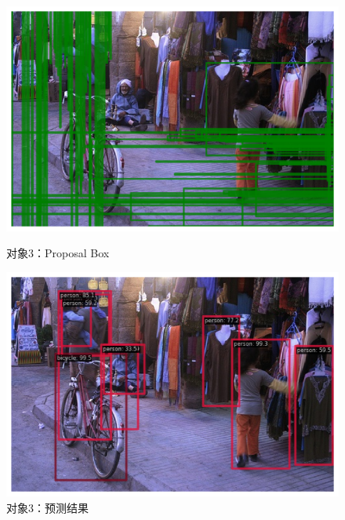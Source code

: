 \documentclass[notitlepage,cs4size,punct,oneside]{ctexrep}
\numberwithin{equation}{chapter}
\theoremstyle{mystyle}
\begin{document}
\begin{figure}[!htpb]
    \centering
    \begin{minipage}[t]{0.49\textwidth}
    \includegraphics[width=\linewidth]{3ppbox.png}
    \caption{对象3：Proposal Box}
    \label{mAPfrcnn}
    \end{minipage}
    \begin{minipage}[t]{0.49\textwidth}
    \includegraphics[width=\linewidth]{3result.png}
    \caption{对象3：预测结果}
    \label{frcnn_loss}
    \end{minipage}
\end{figure}
\end{document}
